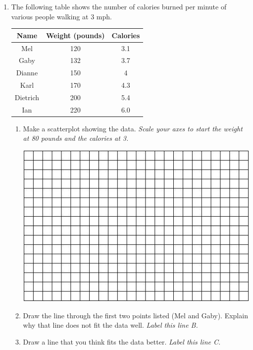 \documentclass[12pt]{article}
\begin{document}
\begin{enumerate}
\newpage

\item The following table shows the number of calories burned per minute of various people walking at 3 mph.

\begin{center}
\begin{tabular} { | c | c | c |} \hline
Name & Weight  (pounds) & Calories \\ \hline \hline
Mel & 120 & 3.1  \\ \hline
Gaby & 132 & 3.7  \\ \hline
Dianne & 150 & 4 \\ \hline
Karl & 170 & 4.3 \\  \hline
Dietrich & 200 & 5.4 \\ \hline
Ian & 220 & 6.0 \\ \hline
\end{tabular}
\end{center}

\begin{enumerate}
\item Make a scatterplot showing the data.  \emph{Scale your axes to start the  weight at 80 pounds and the calories at 3.}
\vfill
\begin{center}
 {\includegraphics [width = 6in] {../GraphPaper}}
\end{center}
\vfill

\item  Draw the line through the first two points listed (Mel and Gaby).  Explain why that line does not fit the data well.  \emph{Label this line B.}
\vfill
\vfill
\vfill
\item  Draw a line that you think fits the data better.  \emph{Label this line C.}
\end{enumerate}


\end{enumerate}
\end{document}

